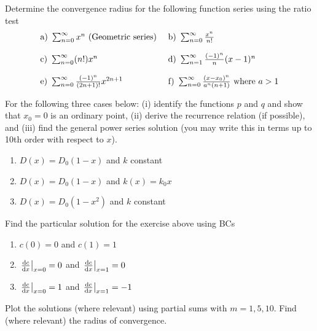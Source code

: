 \begin{exerciseregion}
	\begin{exercise}
		Determine the convergence radius for the following function series using the ratio test
		\[
		\begin{array}{ll}
			\text{a) } \sum_{n=0}^\infty x^n \text{ (Geometric series) \index{Series!geometric} }&  \text{b) } \sum_{n=0}^\infty \frac{x^n}{n!}
			\\
			&
			\\
			\text{c) } \sum_{n=0}^\infty (n!) x^n  & \text{d) } \sum_{n=1}^\infty \frac{(-1)^n}{n} (x-1)^n
			\\
			&
			\\
			\text{e) } \sum_{n=0}^\infty \frac{(-1)^n}{(2n+1)!} x^{2n+1} &\text{f) } \sum_{n=0}^\infty
			\frac{(x-x_0)^n}{a^n(n+1)}  \text{ where } a > 1 
		\end{array}
	\]
	\end{exercise}

	\begin{exercise}
		For the following three cases below: 
		(i) identify the functions $p$ and $q$ and show that $x_0=0$ is an ordinary point, 
		(ii) derive the recurrence relation (if possible), and (iii)
		find the general power series solution (you may write this in terms up to 10th order with respect to $x$).
		\begin{enumerate}
			\item $D(x)=D_0(1 - x)$ and $k$ constant
			\item $D(x)=D_0(1-x)$ and $k(x) = k_0 x$
			\item $D(x)=D_0(1-x^2)$ and $k$ constant
		\end{enumerate}
	\end{exercise}

	\begin{exercise}
		Find the particular solution for the exercise above using BCs
		\begin{enumerate}
			\item $c(0)=0$ and $c(1)=1$
			\item $\left.\frac{\mathrm{d} c}{\mathrm{d} x}\right|_{x=0}=0$ and $\left.\frac{\mathrm{d} c}{\mathrm{d} x}\right|_{x=1}=0$
			\item $\left.\frac{\mathrm{d} c}{\mathrm{d} x}\right|_{x=0}=1$ and $\left.\frac{\mathrm{d} c}{\mathrm{d} x}\right|_{x=1}=-1$
		\end{enumerate}
		Plot the solutions (where relevant) using partial sums with $m=1, 5, 10$. Find (where
		relevant) the radius of convergence.
	\end{exercise}


\end{exerciseregion}
